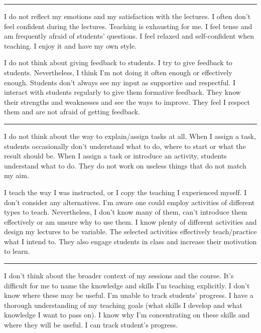 \rule{\textwidth}{0.4pt}
{I do not reflect my emotions and my satisfaction with the lectures.}
{I often don't feel confident during the lectures. Teaching is exhausting for me. I feel tense and am frequently afraid of students' questions.}
{I feel relaxed and self-confident when teaching. I enjoy it and have my own style.}

\newpage
{}
{I do not think about giving feedback to students.}
{I try to give feedback to students. Nevertheless, I think I'm not doing it often enough or effectively enough. Students don't always see my input as supportive and respectful.}
{I interact with students regularly to give them formative feedback. They know their strengths and weaknesses and see the ways to improve. They feel I respect them and are not afraid of getting feedback.}

\rule{\textwidth}{0.4pt}
{I do not think about the way to explain/assign tasks at all.}
{When I assign a task, students occasionally don't understand what to do, where to start or what the result should be.}
{When I assign a task or introduce an activity, students understand what to do. They do not work on useless things that do not match my aim.}

\newpage
{}
{I teach the way I was instructed, or I copy the teaching I experienced myself. I don't consider any alternatives.}
{I'm aware one could employ activities of different types to teach. Nevertheless, I don't know many of them, can't introduce them effectively or am unsure why to use them.}
{I know plenty of different activities and design my lectures to be variable. The selected activities effectively teach/practice what I intend to. They also engage students in class and increase their motivation to learn.}

\rule{\textwidth}{0.4pt}
{I don't think about the broader context of my sessions and the course.}
{It's difficult for me to name the knowledge and skills I'm teaching explicitly. I don't know where these may be useful. I'm unable to track students' progress.}
{I have a thorough understanding of my teaching goals (what skills I develop and what knowledge I want to pass on). I know why I'm concentrating on these skills and where they will be useful. I can track student's progress.}
\vspace*{-1em}

